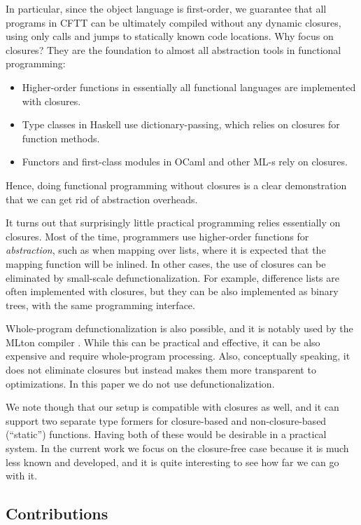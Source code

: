 \documentclass[acmsmall,screen,review,anonymous]{acmart}
\begin{document}
In particular, since the object language is first-order, we guarantee that all
programs in CFTT can be ultimately compiled without any dynamic closures, using
only calls and jumps to statically known code locations. Why focus on closures?
They are the foundation to almost all abstraction tools in functional
programming:
\begin{itemize}
\item Higher-order functions in essentially all functional languages are implemented with closures.
\item Type classes in Haskell use dictionary-passing, which relies on closures for function methods.
\item Functors and first-class modules in OCaml and other ML-s rely on closures.
\end{itemize}
Hence, doing functional programming without closures is a clear demonstration
that we can get rid of abstraction overheads.

It turns out that surprisingly little practical programming relies essentially
on closures. Most of the time, programmers use higher-order functions for
\emph{abstraction}, such as when mapping over lists, where it is expected that
the mapping function will be inlined. In other cases, the use of closures can be
eliminated by small-scale defunctionalization. For example, difference lists
\cite{TODO} are often implemented with closures, but they can be also
implemented as binary trees, with the same programming interface.


Whole-program defunctionalization is also possible, and it is notably used by
the MLton compiler \cite{TODO}. While this can be practical and effective, it
can be also expensive and require whole-program processing. Also, conceptually
speaking, it does not eliminate closures but instead makes them more transparent
to optimizations. In this paper we do not use defunctionalization.

We note though that our setup is compatible with closures as well, and it can
support two separate type formers for closure-based and non-closure-based
(``static'') functions. Having both of these would be desirable in a practical
system. In the current work we focus on the closure-free case because it is much
less known and developed, and it is quite interesting to see how far we
can go with it.

\subsection{Contributions}
\end{document}
